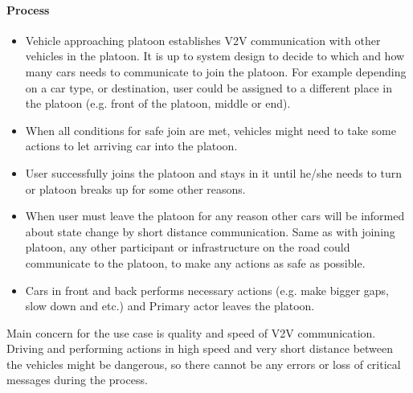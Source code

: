 \paragraph{Process}
\begin{itemize}[noitemsep]
    \item Vehicle approaching platoon establishes \acrshort{V2V} communication with other vehicles in the platoon. It is up to system design to decide to which and how many cars needs to communicate to join the platoon. For example depending on a car type, or destination, user could be assigned to a different place in the platoon (e.g. front of the platoon, middle or end).
    \item When all conditions for safe join are met, vehicles might need to take some actions to let arriving car into the platoon.
    \item User successfully joins the platoon and stays in it until he/she needs to turn or platoon breaks up for some other reasons.
    \item When user must leave the platoon for any reason other cars will be informed about state change by short distance communication. Same as with joining platoon, any other participant or infrastructure on the road could communicate to the platoon, to make any actions as safe as possible.
    \item Cars in front and back performs necessary actions (e.g. make bigger gaps, slow down and etc.) and Primary actor leaves the platoon.
\end{itemize}
% 
Main concern for the use case is quality and speed of \acrshort{V2V} communication. Driving and performing actions in high speed and very short distance between the vehicles might be dangerous, so there cannot be any errors or loss of critical messages during the process.
